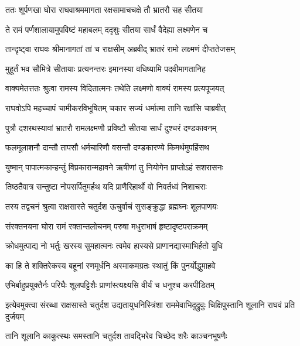 \twolineshloka
{ततः शूर्पणखा घोरा राघवाश्रममागता}
{रक्षसामाचचक्षे तौ भ्रातरौ सह सीतया} %

\twolineshloka
{ते रामं पर्णशालायामुपविष्टं महाबलम्}
{ददृशुः सीतया सार्धं वैदेह्या लक्ष्मणेन च} %

\twolineshloka
{तान्दृष्ट्वा राघवः श्रीमानागतां तां च राक्षसीम्}
{अब्रवीद् भ्रातरं रामो लक्ष्मणं दीप्ततेजसम्} %

\twolineshloka
{मुहूर्तं भव सौमित्रे सीतायाः प्रत्यनन्तरः}
{इमानस्या वधिष्यामि पदवीमागतानिह} %

\twolineshloka
{वाक्यमेतत्ततः श्रुत्वा रामस्य विदितात्मनः}
{तथेति लक्ष्मणो वाक्यं रामस्य प्रत्यपूजयत्} %

\twolineshloka
{राघवोऽपि महच्चापं चामीकरविभूषितम्}
{चकार सज्यं धर्मात्मा तानि रक्षांसि चाब्रवीत्} %

\twolineshloka
{पुत्रौ दशरथस्यावां भ्रातरौ रामलक्ष्मणौ}
{प्रविष्टौ सीतया सार्धं दुश्चरं दण्डकावनम्} %

\twolineshloka
{फलमूलाशनौ दान्तौ तापसौ धर्मचारिणौ}
{वसन्तौ दण्डकारण्ये किमर्थमुपहिंसथ} %

\twolineshloka
{युष्मान् पापात्मकान्हन्तुं विप्रकारान्महावने}
{ऋषीणां तु नियोगेन प्राप्तोऽहं सशरासनः} %

\twolineshloka
{तिष्ठतैवात्र सन्तुष्टा नोपसर्पितुमर्हथ}
{यदि प्राणैरिहार्थो वो निवर्तध्वं निशाचराः} %

\twolineshloka
{तस्य तद्वचनं श्रुत्वा राक्षसास्ते चतुर्दश}
{ऊचुर्वाचं सुसङ्क्रुद्धा ब्रह्मघ्नः शूलपाणयः} %

\twolineshloka
{संरक्तनयना घोरा रामं रक्तान्तलोचनम्}
{परुषा मधुराभाषं हृष्टादृष्टपराक्रमम्} %

\twolineshloka
{क्रोधमुत्पाद्य नो भर्तुः खरस्य सुमहात्मनः}
{त्वमेव हास्यसे प्राणानद्यास्माभिर्हतो युधि} %

\twolineshloka
{का हि ते शक्तिरेकस्य बहूनां रणमूर्धनि}
{अस्माकमग्रतः स्थातुं किं पुनर्योद्धुमाहवे} %

\twolineshloka
{एभिर्बाहुप्रयुक्तैर्नः परिघैः शूलपट्टिशैः}
{प्राणांस्त्यक्ष्यसि वीर्यं च धनुश्च करपीडितम्} %

\threelineshloka
{इत्येवमुक्त्वा संरब्धा राक्षसास्ते चतुर्दश}
{उद्यतायुधनिस्त्रिंशा राममेवाभिदुद्रुवुः}
{चिक्षिपुस्तानि शूलानि राघवं प्रति दुर्जयम्} %

\twolineshloka
{तानि शूलानि काकुत्स्थः समस्तानि चतुर्दश}
{तावद्भिरेव चिच्छेद शरैः काञ्चनभूषणैः} %

